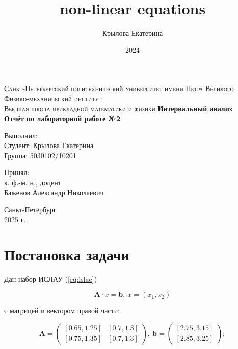 \documentclass[a4paper,14pt]{article}
\title{non-linear equations}
\author{Крылова Екатерина}
\date{2024}
\begin{document}
	
	\begin{titlepage}
		\begin{center}
			\textsc{
				Санкт-Петербургский политехнический университет имени Петра Великого \\[5mm]
				Физико-механический институт\\[2mm]
				Высшая школа прикладной математики и физики            
			}   
			\vfill
			\textbf{\large
				Интервальный анализ\\
				Отчёт по лабораторной работе №2 \\[3mm]
			}                
		\end{center}
		
		\vfill
		\hfill
		\begin{minipage}{0.5\textwidth}
			Выполнил: \\[2mm]   
			Студент: Крылова Екатерина \\
			Группа: 5030102/10201\\
		\end{minipage}
		
		\hfill
		\begin{minipage}{0.5\textwidth}
			Принял: \\[2mm]
			к. ф.-м. н., доцент \\   
			Баженов Александр Николаевич
		\end{minipage}
		
		\vfill
		\begin{center}
			Санкт-Петербург \\2025 г.
		\end{center}
	\end{titlepage}
	
	\tableofcontents
	\newpage

\section{Постановка задачи}

  Дан набор ИСЛАУ (\ref{eq:islae})

  \begin{equation} \label{eq:islae}
    \mathbf{A} \cdot x = \mathbf{b}, \ x = (x_1, x_2)
  \end{equation}

  с матрицей и вектором правой части:

  \begin{equation} \label{eq:problem_1}
    \mathbf{A} = \begin{pmatrix}
      [0.65, 1.25] & [0.7, 1.3] \\
      [0.75, 1.35] & [0.7, 1.3]
    \end{pmatrix},
    ~
    \mathbf{b} = \begin{pmatrix}
      [2.75, 3.15] \\
      [2.85, 3.25]
    \end{pmatrix};
  \end{equation}
\end{document}
